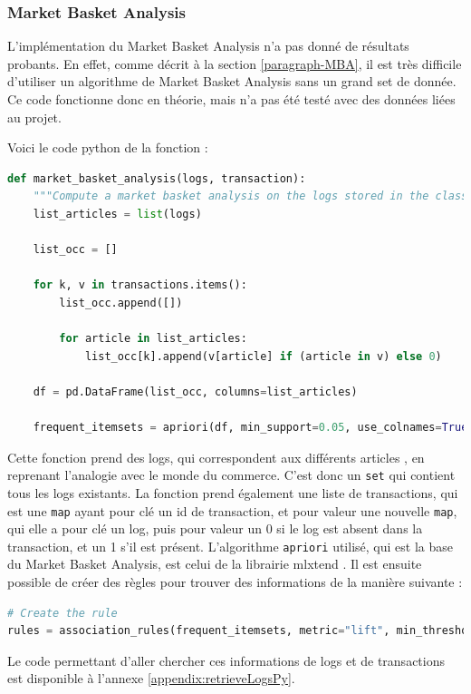 \documentclass[paper=a4, fontsize=11pt]{scrartcl}
\begin{document}
\subsubsection{Market Basket Analysis}
L'implémentation du Market Basket Analysis n'a pas donné de résultats probants. En effet, comme décrit à la section \ref{paragraph-MBA}, il est très difficile d'utiliser un algorithme de Market Basket Analysis sans un grand set de donnée. Ce code fonctionne donc en théorie, mais n'a pas été testé avec des données liées au projet.

Voici le code python de la fonction : \cite{noauthor_introduction_nodate-1}

\begin{lstlisting}[language=python]
def market_basket_analysis(logs, transaction):
    """Compute a market basket analysis on the logs stored in the class."""
    list_articles = list(logs)

    list_occ = []

    for k, v in transactions.items():
        list_occ.append([])

        for article in list_articles:
            list_occ[k].append(v[article] if (article in v) else 0)

    df = pd.DataFrame(list_occ, columns=list_articles)

    frequent_itemsets = apriori(df, min_support=0.05, use_colnames=True)
\end{lstlisting}

Cette fonction prend des logs, qui correspondent aux différents \og articles \fg, en reprenant l'analogie avec le monde du commerce. C'est donc un \verb,set, qui contient tous les logs existants. La fonction prend également une liste de transactions, qui est une \verb,map, ayant pour clé un id de transaction, et pour valeur une nouvelle \verb,map,, qui elle a pour clé un log, puis pour valeur un 0 si le log est absent dans la transaction, et un 1 s'il est présent.\newline
L'algorithme \verb,apriori, utilisé, qui est la base du Market Basket Analysis, est celui de la librairie mlxtend \cite{raschka_mlxtend_2018}. Il est ensuite possible de créer des règles pour trouver des informations de la manière suivante :
\begin{lstlisting}[language=python]
# Create the rule
rules = association_rules(frequent_itemsets, metric="lift", min_threshold=1)
\end{lstlisting}

Le code permettant d'aller chercher ces informations de logs et de transactions est disponible à l'annexe \ref{appendix:retrieveLogsPy}. 
    
\end{document}
